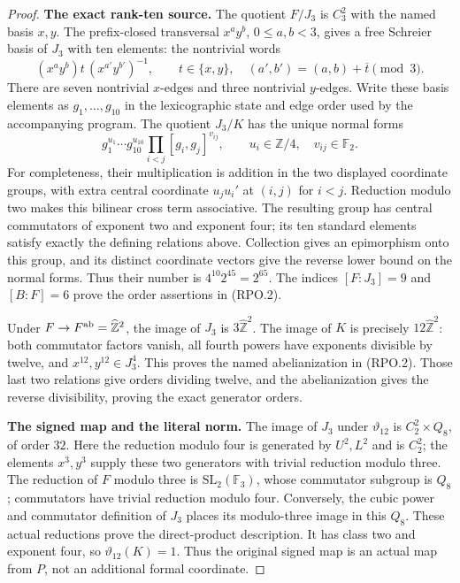 \begin{proof}
\par\medskip\noindent\textbf{The exact rank-ten source.}\quad
The quotient $F/J_3$ is $C_3^2$ with the named
basis $x,y$.  The prefix-closed transversal
$x^ay^b$, $0\leq a,b<3$, gives a free Schreier
basis of $J_3$ with ten elements: the nontrivial
words
\[
 (x^ay^b)t\,(x^{a'}y^{b'})^{-1},\qquad
 t\in\{x,y\},\quad
 (a',b')=(a,b)+\overline t\pmod3.
                                                               \tag{RPO.4}
\]
There are seven nontrivial $x$-edges and three
nontrivial $y$-edges.
Write these basis elements as $g_1,\ldots,g_{10}$
in the lexicographic state and edge order used
by the accompanying program.
The quotient $J_3/K$ has the unique normal forms
\[
 g_1^{u_1}\cdots g_{10}^{u_{10}}
   \prod_{i<j}[g_i,g_j]^{v_{ij}},
 \qquad u_i\in\mathbb Z/4,\quad v_{ij}\in\mathbb F_2.
                                                               \tag{RPO.5}
\]
For completeness, their multiplication is addition
in the two displayed coordinate groups, with
extra central coordinate $u_j u_i'$ at $(i,j)$
for $i<j$.  Reduction modulo two makes this
bilinear cross term associative.  The resulting
group has central commutators of exponent two
and exponent four; its ten standard elements
satisfy exactly the defining relations above.
Collection gives an epimorphism onto this group,
and its distinct coordinate vectors give the
reverse lower bound on the normal forms.
Thus their number is $4^{10}2^{45}=2^{65}$.
The indices $[F:J_3]=9$ and $[B:F]=6$ prove
the order assertions in (RPO.2).

Under $F\to F^{\rm ab}=\widehat{\mathbb Z}^2$,
the image of $J_3$ is $3\widehat{\mathbb Z}^2$.
The image of $K$ is precisely
$12\widehat{\mathbb Z}^2$: both commutator
factors vanish, all fourth powers have exponents
divisible by twelve, and $x^{12},y^{12}\in J_3^4$.
This proves the named abelianization in (RPO.2).
Those last two relations give orders dividing
twelve, and the abelianization gives the reverse
divisibility, proving the exact generator orders.

\par\medskip\noindent\textbf{The signed map and the literal norm.}\quad
The image of $J_3$ under $\vartheta_{12}$ is
$C_2^2\times Q_8$, of order $32$.
Here the reduction modulo four is generated by
$U^2,L^2$ and is $C_2^2$; the elements $x^3,y^3$
supply these two generators with trivial
reduction modulo three.
The reduction of $F$ modulo three is
$\mathrm{SL}_2(\mathbb F_3)$, whose commutator
subgroup is $Q_8$; commutators have trivial
reduction modulo four.  Conversely, the cubic
power and commutator definition of $J_3$ places
its modulo-three image in this $Q_8$.
These actual reductions prove the direct-product
description.  It has class two and exponent four,
so $\vartheta_{12}(K)=1$.
Thus the original signed map is an actual map
from $P$, not an additional formal coordinate.


\end{proof}
